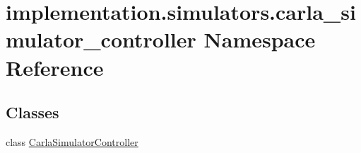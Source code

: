 \hypertarget{namespaceimplementation_1_1simulators_1_1carla__simulator__controller}{}\section{implementation.\+simulators.\+carla\+\_\+simulator\+\_\+controller Namespace Reference}
\label{namespaceimplementation_1_1simulators_1_1carla__simulator__controller}
\subsection*{Classes}
\begin{DoxyCompactItemize}
\item 
class \hyperlink{classimplementation_1_1simulators_1_1carla__simulator__controller_1_1_carla_simulator_controller}{Carla\+Simulator\+Controller}
\end{DoxyCompactItemize}
